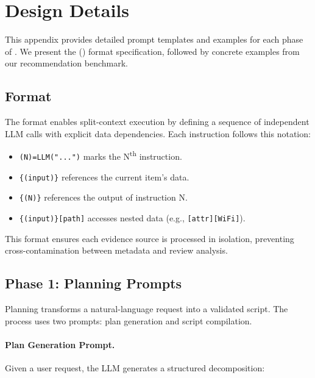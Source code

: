 \section{\method Design Details}
\label{app:method_details}

This appendix provides detailed prompt templates and examples for each phase of \method. We present the \scriptfull (\script) format specification, followed by concrete examples from our recommendation benchmark.

\subsection{\scriptfull Format}
\label{app:lwt_format}

The \script format enables split-context execution by defining a sequence of independent LLM calls with explicit data dependencies. Each instruction follows this notation:

\begin{itemize}[nosep]
    \item \texttt{(N)=LLM("...")} marks the N\textsuperscript{th} instruction.
    \item \texttt{\{(input)\}} references the current item's data.
    \item \texttt{\{(N)\}} references the output of instruction N.
    \item \texttt{\{(input)\}[path]} accesses nested data (e.g., \texttt{[attr][WiFi]}).
\end{itemize}

This format ensures each evidence source is processed in isolation, preventing cross-contamination between metadata and review analysis.

\subsection{Phase 1: Planning Prompts}

Planning transforms a natural-language request into a validated \script script. The process uses two prompts: plan generation and script compilation.

\paragraph{Plan Generation Prompt.}
Given a user request, the LLM generates a structured decomposition:

